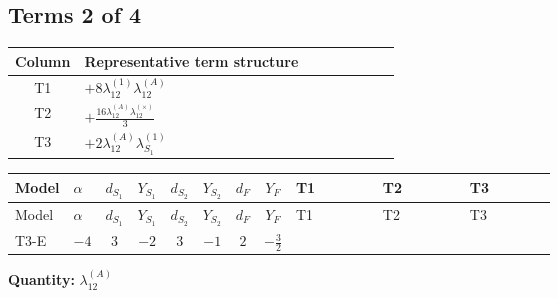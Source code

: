 \documentclass[8pt]{article}
\begin{document}
\begin{landscape}
\subsection*{Terms 2 of 4}
\begin{center}
\begin{tabular}{@{}c >{\raggedright\arraybackslash}p{0.82\linewidth}@{}}
\toprule
Column & Representative term structure \\
\midrule
T1 & \(\displaystyle +8 {\lambda_{12}^{(1)}} {\lambda_{12}^{(A)}}\) \\
\midrule
T2 & \(\displaystyle +\frac{16 {\lambda_{12}^{(A)}} {\lambda_{12}^{(\times)}}}{3}\) \\
\midrule
T3 & \(\displaystyle +2 {\lambda_{12}^{(A)}} {\lambda_{S_1}^{(1)}}\) \\
\midrule
\bottomrule
\end{tabular}
\end{center}
\smallskip
\tiny
\begin{longtable}{@{}llcccccc >{\raggedright\arraybackslash}p{0.21\linewidth} >{\raggedright\arraybackslash}p{0.21\linewidth} >{\raggedright\arraybackslash}p{0.21\linewidth}@{}}
\toprule
Model & $\alpha$ & $d_{S_1}$ & $Y_{S_1}$ & $d_{S_2}$ & $Y_{S_2}$ & $d_F$ & $Y_F$ & T1 & T2 & T3 \\
\midrule
\endfirsthead
\toprule
Model & $\alpha$ & $d_{S_1}$ & $Y_{S_1}$ & $d_{S_2}$ & $Y_{S_2}$ & $d_F$ & $Y_F$ & T1 & T2 & T3 \\
\midrule
\endhead
T3-E & $-4$ & $3$ & $-2$ & $3$ & $-1$ & $2$ & $-\frac{3}{2}$ & \scriptsize\adjustbox{max width=\linewidth}{$\begin{gathered} +8 {\lambda_{12}^{(1)}} {\lambda_{12}^{(A)}}\end{gathered}$} & \scriptsize\adjustbox{max width=\linewidth}{$\begin{gathered} +\frac{16 {\lambda_{12}^{(A)}} {\lambda_{12}^{(\times)}}}{3}\end{gathered}$} & \scriptsize\adjustbox{max width=\linewidth}{$\begin{gathered} +2 {\lambda_{12}^{(A)}} {\lambda_{S_1}^{(1)}}\end{gathered}$} \\
\midrule
\bottomrule
\end{longtable}
\clearpage
\noindent\textbf{Quantity: }$\lambda_{12}^{(A)}$\par\smallskip

\end{landscape}
\end{document}
